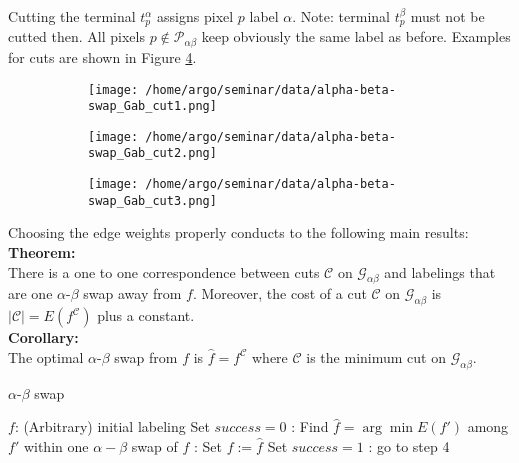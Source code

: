 \documentclass{scrartcl}[12pt, halfparskip]
\begin{document}
Cutting the terminal $t_p^\alpha$ assigns pixel $p$ label $\alpha$. Note: terminal  $t_p^\beta$ must not be cutted then. All pixels $p \notin \mathcal{P}_{\alpha \beta}$ keep obviously the same label as before. Examples for cuts are shown in Figure \ref{fig:alpha-beta-swap_Gab_cuts}.


\begin{figure}[H]
	\begin{subfigure}{0.32\textwidth}
		\centering
		\texttt{[image: /home/argo/seminar/data/alpha-beta-swap\_Gab\_cut1.png]}
		\caption{}
		\label{fig:alpha-beta-swap_Gab_cut1}
	\end{subfigure}
	\begin{subfigure}{0.32\textwidth}
		\centering
		\texttt{[image: /home/argo/seminar/data/alpha-beta-swap\_Gab\_cut2.png]}
		\caption{}
		\label{fig:alpha-beta-swap_Gab_cut2}
	\end{subfigure}
	\begin{subfigure}{0.32\textwidth}
		\centering
		\texttt{[image: /home/argo/seminar/data/alpha-beta-swap\_Gab\_cut3.png]}
		\caption{}
		\label{fig:alpha-beta-swap_Gab_cut3}
	\end{subfigure}
\caption{}
\label{fig:alpha-beta-swap_Gab_cuts}
\end{figure}


Choosing the edge weights properly conducts to the following main results: \\

\textbf{Theorem:}\\
There is a one to one correspondence between cuts $\mathcal{C}$ on $\mathcal{G}_{\alpha \beta}$ and labelings that are one $\alpha$-$\beta$ swap away from $f$. Moreover, the cost of a cut $\mathcal{C}$ on $\mathcal{G}_{\alpha \beta}$ is $|\mathcal{C}| = E(f^\mathcal{C})$ plus a constant. \\

\textbf{Corollary:}\\
The optimal $\alpha$-$\beta$ swap from $f$ is $\hat{f} = f^\mathcal{C}$ where $\mathcal{C}$ is the minimum cut on $\mathcal{G}_{\alpha \beta}$.



\begin{algorithm}[H]
\caption{$\alpha$-$\beta$ swap}\label{alg:alpha-beta-swap}
\begin{algorithmic}[1]
	\State $f$: (Arbitrary) initial labeling 
	\State
	\State Set $success = 0$
	:
		\State Find $\hat{f} = \arg \min E(f')$ among $f'$ within one $\alpha-\beta$ swap of $f$
		:
			\State Set $f := \hat{f}$
			\State Set $success = 1$
		\EndIf
	\EndFor
	:
		\State go to step 4
	\EndIf
	\State
	\State {}
\EndProcedure
\end{algorithmic}
\end{algorithm}
\end{document}
